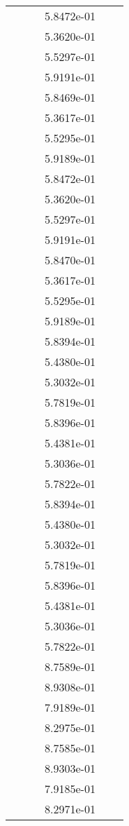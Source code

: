 \begin{xltabular}{\textwidth}{r|rS[table-format=1.3e+2]S[table-format=1.4e+2]S[table-format=1.4e+2]S[table-format=-1.5]}
&  &  & 5.8472e-01 & & \\
&  &  & 5.3620e-01 & & \\
&  &  & 5.5297e-01 & & \\
&  &  & 5.9191e-01 & & \\
&  &  & 5.8469e-01 & & \\
&  &  & 5.3617e-01 & & \\
&  &  & 5.5295e-01 & & \\
&  &  & 5.9189e-01 & & \\
&  &  & 5.8472e-01 & & \\
&  &  & 5.3620e-01 & & \\
&  &  & 5.5297e-01 & & \\
&  &  & 5.9191e-01 & & \\
&  &  & 5.8470e-01 & & \\
&  &  & 5.3617e-01 & & \\
&  &  & 5.5295e-01 & & \\
&  &  & 5.9189e-01 & & \\
&  &  & 5.8394e-01 & & \\
&  &  & 5.4380e-01 & & \\
&  &  & 5.3032e-01 & & \\
&  &  & 5.7819e-01 & & \\
&  &  & 5.8396e-01 & & \\
&  &  & 5.4381e-01 & & \\
&  &  & 5.3036e-01 & & \\
&  &  & 5.7822e-01 & & \\
&  &  & 5.8394e-01 & & \\
&  &  & 5.4380e-01 & & \\
&  &  & 5.3032e-01 & & \\
&  &  & 5.7819e-01 & & \\
&  &  & 5.8396e-01 & & \\
&  &  & 5.4381e-01 & & \\
&  &  & 5.3036e-01 & & \\
&  &  & 5.7822e-01 & & \\
&  &  & 8.7589e-01 & & \\
&  &  & 8.9308e-01 & & \\
&  &  & 7.9189e-01 & & \\
&  &  & 8.2975e-01 & & \\
&  &  & 8.7585e-01 & & \\
&  &  & 8.9303e-01 & & \\
&  &  & 7.9185e-01 & & \\
&  &  & 8.2971e-01 & & \\

\end{xltabular}
